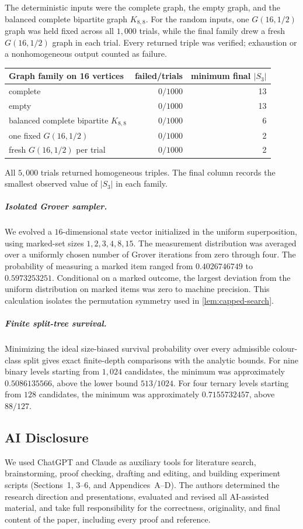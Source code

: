 The deterministic inputs were the complete graph, the empty graph, and the
balanced complete bipartite graph $K_{8,8}$.  For the random inputs, one
$G(16,1/2)$ graph was held fixed across all $1{,}000$ trials, while the final
family drew a fresh $G(16,1/2)$ graph in each trial.  Every returned triple was
verified; exhaustion or a nonhomogeneous output counted as failure.

\begin{center}
\begin{tabular}{lrr}
\hline
Graph family on 16 vertices & failed/trials & minimum final $|S_3|$\\
\hline
complete & $0/1000$ & 13\\
empty & $0/1000$ & 13\\
balanced complete bipartite $K_{8,8}$ & $0/1000$ & 6\\
one fixed $G(16,1/2)$ & $0/1000$ & 2\\
fresh $G(16,1/2)$ per trial & $0/1000$ & 2\\
\hline
\end{tabular}
\end{center}

All $5{,}000$ trials returned homogeneous triples.  The final column records
the smallest observed value of $|S_3|$ in each family.

\subparagraph*{Isolated Grover sampler.}
We evolved a $16$-dimensional state vector initialized in the uniform
superposition, using marked-set sizes $1,2,3,4,8,15$.  The measurement
distribution was averaged over a uniformly chosen number of Grover iterations
from zero through four.  The probability of measuring a marked item ranged
from $0.4026746749$ to $0.5973253251$.  Conditional on a marked outcome, the
largest deviation from the uniform distribution on marked items was zero to
machine precision.  This calculation isolates the permutation symmetry used
in \cref{lem:capped-search}.

\subparagraph*{Finite split-tree survival.}
Minimizing the ideal size-biased survival probability over every admissible
colour-class split gives exact finite-depth comparisons with the analytic
bounds.  For nine binary levels starting from $1{,}024$ candidates, the
minimum was approximately $0.5086135566$, above the lower bound $513/1024$.
For four ternary levels starting from $128$ candidates, the minimum was
approximately $0.7155732457$, above $88/127$.

\subsection{AI Disclosure}
\label{app:ai-disclosure}

We used ChatGPT and Claude as auxiliary tools for literature search,
brainstorming, proof checking, drafting and editing, and building experiment
scripts (Sections~1, 3--6, and Appendices~A--D).  The authors
determined the research direction and presentations, evaluated and revised
all AI-assisted material, and take full responsibility for the correctness,
originality, and final content of the paper, including every proof and
reference.
